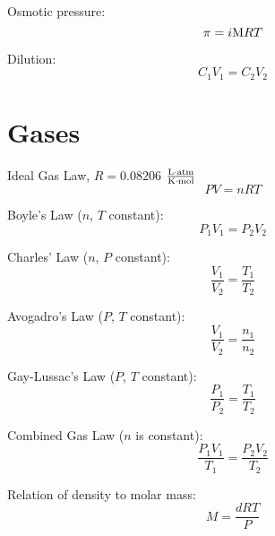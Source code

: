 \documentclass[10pt]{article}
\begin{document}
Osmotic pressure:
\begin{equation*}
\pi=i\textnormal{M}RT
\end{equation*}

Dilution:
\begin{equation*}
C_1V_1=C_2V_2
\end{equation*}


\section{Gases}


Ideal Gas Law, $R=0.08206$ $\frac{\textnormal{L$\cdot$atm}}{\textnormal{K$\cdot$mol}}$
\begin{equation*}
PV=nRT
\end{equation*}

Boyle's Law ($n$, $T$ constant):
\begin{equation*}
P_1V_1=P_2V_2
\end{equation*}

Charles' Law ($n$, $P$ constant):
\begin{equation*}
\frac{V_1}{V_2} = \frac{T_1}{T_2} 
\end{equation*}

Avogadro's Law ($P$, $T$ constant):
\begin{equation*}
\frac{V_1}{V_2} = \frac{n_1}{n_2} 
\end{equation*}

Gay-Lussac's Law ($P$, $T$ constant):
\begin{equation*}
\frac{P_1}{P_2} = \frac{T_1}{T_2} 
\end{equation*}

Combined Gas Law ($n$ is constant):
\begin{equation*}
\frac{P_1V_1}{T_1} = \frac{P_2V_2}{T_2}
\end{equation*}

Relation of density to molar mass:
\begin{equation*}
M = \frac{dRT}{P}
\end{equation*}
\end{document}
